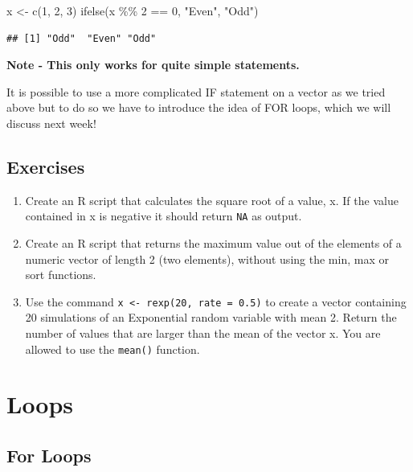\documentclass[
]{book}
\newenvironment{Shaded}{\begin{snugshade}}{\end{snugshade}}
\newcommand{\DecValTok}[1]{\textcolor[rgb]{0.00,0.00,0.81}{#1}}
\newcommand{\FunctionTok}[1]{\textcolor[rgb]{0.00,0.00,0.00}{#1}}
\newcommand{\NormalTok}[1]{#1}
\newcommand{\OtherTok}[1]{\textcolor[rgb]{0.56,0.35,0.01}{#1}}
\newcommand{\SpecialCharTok}[1]{\textcolor[rgb]{0.00,0.00,0.00}{#1}}
\newcommand{\StringTok}[1]{\textcolor[rgb]{0.31,0.60,0.02}{#1}}
\theoremstyle{definition}
\theoremstyle{definition}
\theoremstyle{definition}
\theoremstyle{definition}
\theoremstyle{remark}
\begin{document}
\begin{Shaded}
\begin{Highlighting}[]
\NormalTok{x }\OtherTok{\textless{}{-}} \FunctionTok{c}\NormalTok{(}\DecValTok{1}\NormalTok{, }\DecValTok{2}\NormalTok{, }\DecValTok{3}\NormalTok{)}
\FunctionTok{ifelse}\NormalTok{(x }\SpecialCharTok{\%\%} \DecValTok{2} \SpecialCharTok{==} \DecValTok{0}\NormalTok{, }\StringTok{"Even"}\NormalTok{, }\StringTok{"Odd"}\NormalTok{)}
\end{Highlighting}
\end{Shaded}

\begin{verbatim}
## [1] "Odd"  "Even" "Odd"
\end{verbatim}

\textbf{Note - This only works for quite simple statements.}

It is possible to use a more complicated IF statement on a vector as we tried above but to do so we have to introduce the idea of FOR loops, which we will discuss next week!

\hypertarget{exercises-3}{%
\section{Exercises}\label{exercises-3}}

\begin{enumerate}
\def\labelenumi{\arabic{enumi}.}
\item
  Create an R script that calculates the square root of a value, x. If the value contained in x is negative it should return \texttt{NA} as output.
\item
  Create an R script that returns the maximum value out of the elements of a numeric vector of length 2 (two elements), without using the min, max or sort functions.
\item
  Use the command \texttt{x\ \textless{}-\ rexp(20,\ rate\ =\ 0.5)} to create a vector containing 20 simulations of an Exponential random variable with mean 2. Return the number of values that are larger than the mean of the vector x. You are allowed to use the \texttt{mean()} function.
\end{enumerate}

\hypertarget{loops}{%
\chapter{Loops}\label{loops}}

\hypertarget{for-loops}{%
\section{For Loops}\label{for-loops}}
\end{document}
